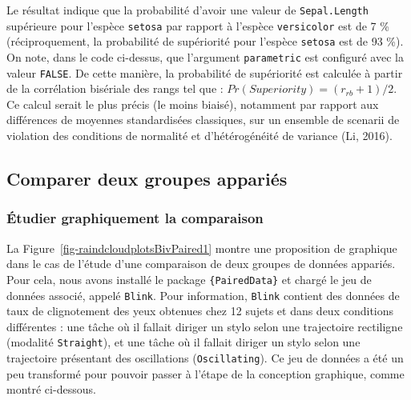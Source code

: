 \documentclass[
  letterpaper,
]{book}
\begin{document}
Le résultat indique que la probabilité d'avoir une valeur de
\texttt{Sepal.Length} supérieure pour l'espèce \texttt{setosa} par
rapport à l'espèce \texttt{versicolor} est de 7 \% (réciproquement, la
probabilité de supériorité pour l'espèce \texttt{setosa} est de 93 \%).
On note, dans le code ci-dessus, que l'argument \texttt{parametric} est
configuré avec la valeur \texttt{FALSE}. De cette manière, la
probabilité de supériorité est calculée à partir de la corrélation
bisériale des rangs tel que : \(Pr(Superiority) = (r_{rb} + 1)/2\). Ce
calcul serait le plus précis (le moins biaisé), notamment par rapport
aux différences de moyennes standardisées classiques, sur un ensemble de
scenarii de violation des conditions de normalité et d'hétérogénéité de
variance (Li, 2016).

\subsection{Comparer deux groupes
appariés}\label{comparer-deux-groupes-appariuxe9s}

\subsubsection{Étudier graphiquement la
comparaison}\label{uxe9tudier-graphiquement-la-comparaison-1}

La Figure~\ref{fig-raindcloudplotsBivPaired1} montre une proposition de
graphique dans le cas de l'étude d'une comparaison de deux groupes de
données appariés. Pour cela, nous avons installé le package
\texttt{\{PairedData\}} et chargé le jeu de données associé, appelé
\texttt{Blink}. Pour information, \texttt{Blink} contient des données de
taux de clignotement des yeux obtenues chez 12 sujets et dans deux
conditions différentes : une tâche où il fallait diriger un stylo selon
une trajectoire rectiligne (modalité \texttt{Straight}), et une tâche où
il fallait diriger un stylo selon une trajectoire présentant des
oscillations (\texttt{Oscillating}). Ce jeu de données a été un peu
transformé pour pouvoir passer à l'étape de la conception graphique,
comme montré ci-dessous.
\end{document}
